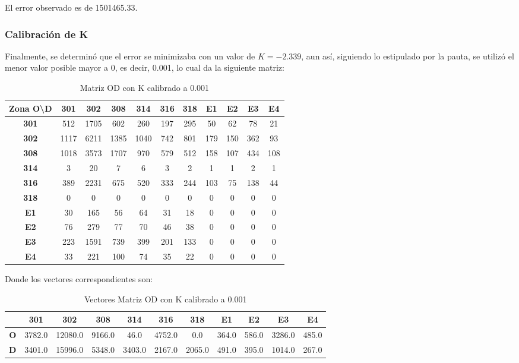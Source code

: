 \documentclass[12pt]{article} %
\begin{document}
El error observado es de 1501465.33.

\subsubsection{Calibración de K}

Finalmente, se determinó que el error se minimizaba con un valor de \(K = -2.339\), aun así, siguiendo lo estipulado por la pauta, se utilizó el menor valor posible mayor a 0, es decir, 0.001, lo cual da la siguiente matriz:

\begin{table}[H]
  \centering
  \footnotesize
  \begin{tabular}{c|cccccccccc}    
  \textbf{Zona O\textbackslash D} & \textbf{301} & \textbf{302} & \textbf{308} & \textbf{314} & \textbf{316} & \textbf{318} & \textbf{E1} & \textbf{E2} & \textbf{E3} & \textbf{E4} \\ \hline
  \textbf{301} & 512 & 1705 & 602 & 260 & 197 & 295 & 50 & 62 & 78 & 21 \\ 
  \textbf{302} & 1117 & 6211 & 1385 & 1040 & 742 & 801 & 179 & 150 & 362 & 93 \\ 
  \textbf{308} & 1018 & 3573 & 1707 & 970 & 579 & 512 & 158 & 107 & 434 & 108 \\ 
  \textbf{314} & 3 & 20 & 7 & 6 & 3 & 2 & 1 & 1 & 2 & 1 \\ 
  \textbf{316} & 389 & 2231 & 675 & 520 & 333 & 244 & 103 & 75 & 138 & 44 \\ 
  \textbf{318} & 0 & 0 & 0 & 0 & 0 & 0 & 0 & 0 & 0 & 0 \\ 
  \textbf{E1} & 30 & 165 & 56 & 64 & 31 & 18 & 0 & 0 & 0 & 0 \\ 
  \textbf{E2} & 76 & 279 & 77 & 70 & 46 & 38 & 0 & 0 & 0 & 0 \\ 
  \textbf{E3} & 223 & 1591 & 739 & 399 & 201 & 133 & 0 & 0 & 0 & 0 \\ 
  \textbf{E4} & 33 & 221 & 100 & 74 & 35 & 22 & 0 & 0 & 0 & 0 \\ 
  \end{tabular}
  \caption{Matriz OD con K calibrado a 0.001}
  \label{table:M_K2}
\end{table}

Donde los vectores correspondientes son: 

\begin{table}[H]
  \centering
  \footnotesize
  \begin{tabular}{c|cccccccccc}    
  \textbf{} & \textbf{301} & \textbf{302} & \textbf{308} & \textbf{314} & \textbf{316} & \textbf{318} & \textbf{E1} & \textbf{E2} & \textbf{E3} & \textbf{E4} \\ \hline
  \textbf{O} & 3782.0 & 12080.0 & 9166.0 & 46.0 & 4752.0 & 0.0 & 364.0 & 586.0 & 3286.0 & 485.0 \\ 
  \textbf{D} & 3401.0 & 15996.0 & 5348.0 & 3403.0 & 2167.0 & 2065.0 & 491.0 & 395.0 & 1014.0 & 267.0 \\ 
  \end{tabular}
  \caption{Vectores Matriz OD con K calibrado a 0.001}
  \label{table:data_matrix}
\end{table}
\end{document}
